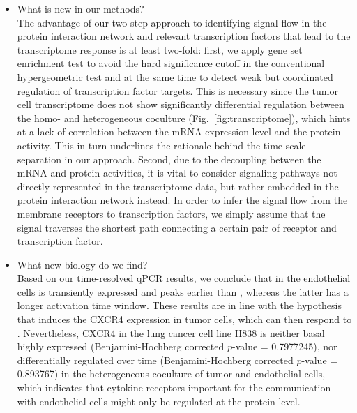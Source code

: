 \begin{itemize}
\item What is new in our methods?\\
The advantage of our two-step approach to identifying signal flow in the protein 
interaction
network and relevant transcription factors that lead to the transcriptome response
is at least two-fold: first, we apply gene set enrichment test to avoid the hard 
significance cutoff in the conventional hypergeometric test and at the same time
to detect weak but coordinated regulation of transcription factor targets. This is 
necessary since the tumor cell transcriptome does not show significantly
differential regulation between the homo- and heterogeneous coculture 
(Fig.~\ref{fig:transcriptome}), which 
hints at a lack of correlation between the mRNA expression level and the protein 
activity. This in turn underlines the rationale behind the time-scale separation
in our approach. Second, due to the decoupling between the mRNA and protein
activities, it is vital to consider signaling pathways not directly represented
in the transcriptome data, but rather embedded in the protein interaction network
instead. In order to infer the signal flow from the membrane receptors to 
transcription factors, we simply assume that the signal traverses the shortest
path connecting a certain pair of receptor and transcription factor.

\item What new  biology do we find?\\
Based on our time-resolved qPCR results, we conclude that \tnfa in the endothelial 
cells is 
transiently expressed and peaks earlier than \sdfonea, whereas the latter has
a longer activation time window. These results are in line with the hypothesis 
that \tnfa induces the CXCR4 expression in tumor cells, which can then respond
to \sdfonea. Nevertheless, CXCR4 in the lung cancer cell line H838 is neither
basal highly expressed (Benjamini-Hochberg corrected $p$-value = 0.7977245), nor differentially regulated over time (Benjamini-Hochberg
corrected $p$-value = 0.893767) in the 
heterogeneous coculture of tumor and endothelial cells, which indicates that
cytokine receptors important for the communication with endothelial cells might
only be regulated at the protein level.


\end{itemize}

